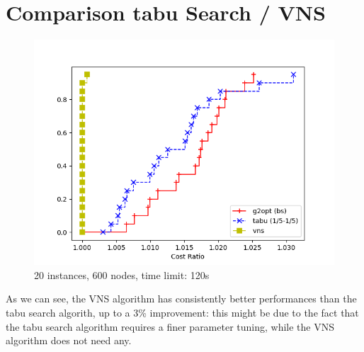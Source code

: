 \section{Comparison tabu Search / VNS}

\FloatBarrier
\begin{figure}[h]
    \centering
    \includegraphics*[width=.6\textwidth]{../plots/perfprof_met_costs_result.png}
    \caption*{20 instances, 600 nodes, time limit: 120s}
\end{figure}

As we can see, the VNS algorithm has consistently better performances than the tabu search algorith, up to a 3\% improvement: this might be due to the fact that the tabu search algorithm requires a finer parameter tuning, while the VNS algorithm does not need any.